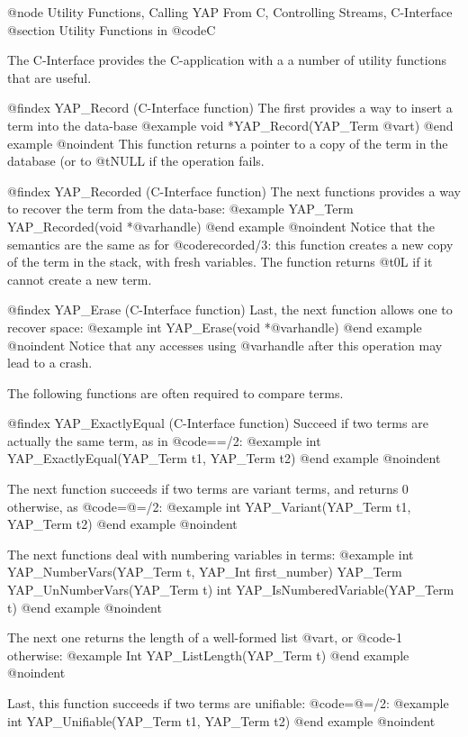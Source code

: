 {{{{{{{{{@node Utility Functions, Calling YAP From C, Controlling Streams, C-Interface
@section Utility Functions in @code{C}


The C-Interface  provides the C-application with a a number of utility
functions that are useful.


@findex YAP_Record (C-Interface function)
The first provides a way to insert a term into the data-base
@example
      void      *YAP_Record(YAP_Term @var{t})
@end example
@noindent
This function returns a pointer to a copy of the term in the database
(or to @t{NULL} if the operation fails.

@findex YAP_Recorded (C-Interface function)
The next functions provides a way to recover the term from the data-base:
@example
      YAP_Term      YAP_Recorded(void *@var{handle})
@end example
@noindent
Notice that the semantics are the same as for @code{recorded/3}: this
function creates a new copy of the term in the stack, with fresh
variables. The function returns @t{0L} if it cannot create a new term.

@findex YAP_Erase (C-Interface function)
Last, the next function allows one to recover space:
@example
      int      YAP_Erase(void *@var{handle})
@end example
@noindent
Notice that any accesses using @var{handle} after this operation may
lead to a crash.

The following functions are often required to compare terms.

@findex YAP_ExactlyEqual (C-Interface function)
Succeed if two terms are actually the same term, as in
@code{==/2}:
@example
      int      YAP_ExactlyEqual(YAP_Term t1, YAP_Term t2)
@end example
@noindent

The next function succeeds if two terms are variant terms, and returns
0 otherwise, as
@code{=@=/2}:
@example
      int      YAP_Variant(YAP_Term t1, YAP_Term t2)
@end example
@noindent

The next functions deal with numbering variables in terms:
@example
      int      YAP_NumberVars(YAP_Term t, YAP_Int first_number)
      YAP_Term YAP_UnNumberVars(YAP_Term t)
      int      YAP_IsNumberedVariable(YAP_Term t)
@end example
@noindent

The next one returns the length of a well-formed list @var{t}, or
@code{-1} otherwise:
@example
      Int      YAP_ListLength(YAP_Term t)
@end example
@noindent


Last, this function succeeds if two terms are unifiable:
@code{=@=/2}:
@example
      int      YAP_Unifiable(YAP_Term t1, YAP_Term t2)
@end example
@noindent

}}}}}}}}}
